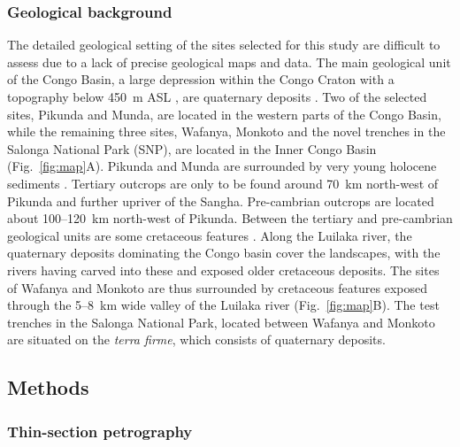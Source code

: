 \documentclass[preprint,10pt,oneside,onecolumn,authoryear]{elsarticle}
\begin{document}
\subsubsection{Geological background}

The detailed geological setting of the sites selected for this study are difficult to assess due to a lack of precise geological maps and data. The main geological unit of the Congo Basin, a large depression within the Congo Craton with a topography below 450~m ASL \citep[11--12]{Runge.2001}, are quaternary deposits \citep{Persits.1997}. Two of the selected sites, Pikunda and Munda, are located in the western parts of the Congo Basin, while the remaining three sites, Wafanya, Monkoto and the novel trenches in the Salonga National Park (SNP), are located in the Inner Congo Basin (Fig.~\ref{fig:map}A). Pikunda and Munda are surrounded by very young holocene sediments \citep{Persits.1997}. Tertiary outcrops are only to be found around 70~km north-west of Pikunda and further upriver of the Sangha. Pre-cambrian outcrops are located about 100--120~km north-west of Pikunda. Between the tertiary and pre-cambrian geological units are some cretaceous features \citep{Persits.1997}. Along the Luilaka river, the quaternary deposits dominating the Congo basin cover the landscapes, with the rivers having carved into these and exposed older cretaceous deposits. The sites of Wafanya and Monkoto are thus surrounded by cretaceous features exposed through the 5--8~km wide valley of the Luilaka river (Fig.~\ref{fig:map}B). The test trenches in the Salonga National Park, located between Wafanya and Monkoto are situated on the \textit{terra firme}, which consists of quaternary deposits.

\subsection{Methods}

\subsubsection{Thin-section petrography}
\end{document}
